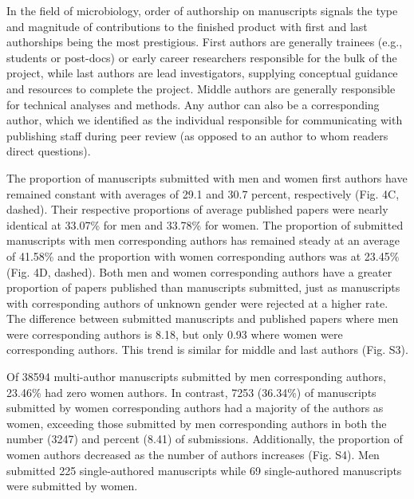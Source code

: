 \documentclass[11pt,]{article}
\begin{document}
In the field of microbiology, order of authorship on manuscripts signals
the type and magnitude of contributions to the finished product with
first and last authorships being the most prestigious. First authors are
generally trainees (e.g., students or post-docs) or early career
researchers responsible for the bulk of the project, while last authors
are lead investigators, supplying conceptual guidance and resources to
complete the project. Middle authors are generally responsible for
technical analyses and methods. Any author can also be a corresponding
author, which we identified as the individual responsible for
communicating with publishing staff during peer review (as opposed to an
author to whom readers direct questions).

The proportion of manuscripts submitted with men and women first authors
have remained constant with averages of 29.1 and 30.7 percent,
respectively (Fig. 4C, dashed). Their respective proportions of average
published papers were nearly identical at 33.07\% for men and 33.78\%
for women. The proportion of submitted manuscripts with men
corresponding authors has remained steady at an average of 41.58\% and
the proportion with women corresponding authors was at 23.45\% (Fig. 4D,
dashed). Both men and women corresponding authors have a greater
proportion of papers published than manuscripts submitted, just as
manuscripts with corresponding authors of unknown gender were rejected
at a higher rate. The difference between submitted manuscripts and
published papers where men were corresponding authors is 8.18, but only
0.93 where women were corresponding authors. This trend is similar for
middle and last authors (Fig. S3).

Of 38594 multi-author manuscripts submitted by men corresponding
authors, 23.46\% had zero women authors. In contrast, 7253 (36.34\%) of
manuscripts submitted by women corresponding authors had a majority of
the authors as women, exceeding those submitted by men corresponding
authors in both the number (3247) and percent (8.41) of submissions.
Additionally, the proportion of women authors decreased as the number of
authors increases (Fig. S4). Men submitted 225 single-authored
manuscripts while 69 single-authored manuscripts were submitted by
women.
\end{document}
